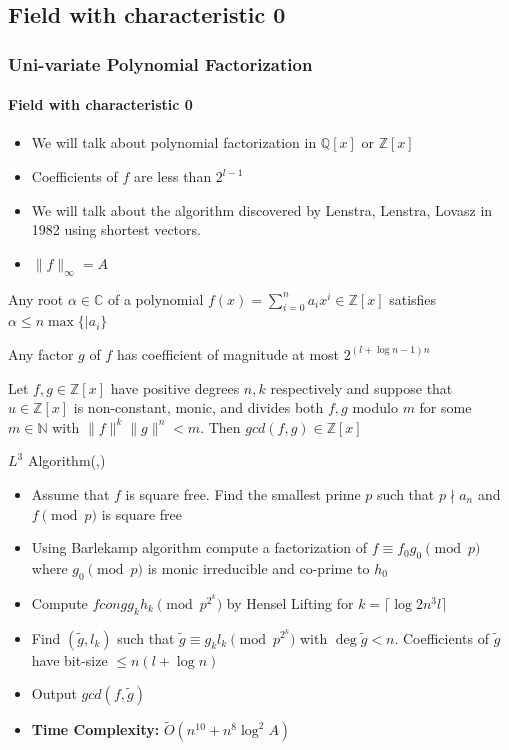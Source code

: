 \documentclass[10pt]{beamer}
\begin{document}

\subsection{Field with characteristic 0}
\begin{frame}[allowframebreaks]
\frametitle{Uni-variate Polynomial Factorization}
\framesubtitle{Field with characteristic 0}
\begin{itemize}
	\item We will talk about polynomial factorization in $\mathbb{Q}[x]$ or $\mathbb{Z}[x]$
	\item Coefficients of $f$ are less than $2^{l-1}$
	\item We will talk about the algorithm discovered by Lenstra, Lenstra, Lovasz in 1982 \cite{lllalgo} using shortest vectors.
	\item $\|f\|_{\infty}=A$
\end{itemize}
\begin{theorem}
	Any root $\alpha\in\mathbb{C}$ of a polynomial $f(x)=\sum\limits_{i=0}^na_ix^i\in \mathbb{Z}[x]$ satisfies $\alpha\leq n\max \{|a_i\}$
\end{theorem}
\begin{theorem}
	Any factor $g$ of $f$ has coefficient of magnitude at most $2^{(l+\log n-1)n}$
\end{theorem}
\begin{theorem}
	Let $f,g\in \mathbb{Z}[x]$ have positive degrees $n,k$ respectively and suppose that $u\in\mathbb{Z}[x]$ is non-constant, monic, and divides both $f,g$ modulo $m$ for some $m\in \mathbb{N}$ with $\|f\|^k\|g\|^n<m$. Then $gcd(f,g)\in \mathbb{Z}[x]$
\end{theorem}

{\large{$L^3$ Algorithm}}(\cite{lllalgo},{\cite[Chapter 16]{gathenalgebra}})
\begin{itemize}
	\item Assume that $f$ is square free. Find the smallest prime $p$ such that $p\nmid a_n$ and $f\pmod p$ is square free
	\item Using Barlekamp algorithm compute a factorization of $f\equiv f_0g_0\pmod p$ where $g_0\pmod p$ is monic irreducible and co-prime to $h_0$
	\item Compute $fcong g_kh_k\pmod {p^{2^k}}$ by Hensel Lifting for $k=\lceil \log 2n^3l\rceil$
	\item Find $(\tilde{g},l_k)$ such that $\tilde{g}\equiv g_kl_k\pmod{p^{2^k}}$ with $\deg \tilde{g}<n$. Coefficients of $\tilde{g}$ have bit-size $\leq n(l+\log n)$
	\item Output $gcd(f,\tilde{g})$
	\item \textbf{Time Complexity: }$\tilde{O}(n^{10}+n^8\log^2A)$ 
\end{itemize}


\end{frame}
\end{document}
